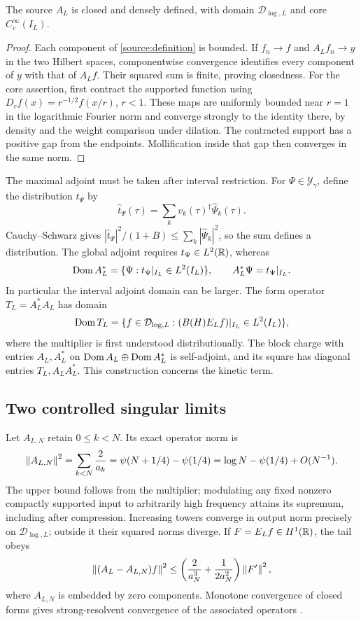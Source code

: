 \begin{proposition}\label{source:closed}
The source $A_L$ is closed and densely defined, with domain
$\mathcal D_{\log,L}$ and core $C_c^\infty(I_L)$.
\end{proposition}
\begin{proof}
Each component of \eqref{source:definition} is bounded. If
$f_n\to f$ and $A_Lf_n\to y$ in the two Hilbert spaces, componentwise
convergence identifies every component of $y$ with that of $A_Lf$.
Their squared sum is finite, proving closedness.
For the core assertion, first contract the supported function using
$D_rf(x)=r^{-1/2}f(x/r)$, $r<1$. These maps are uniformly bounded
near $r=1$ in the logarithmic Fourier norm and converge strongly
to the identity there, by density and the weight comparison under
dilation. The contracted support has a positive gap from the
endpoints. Mollification inside that gap then converges in the
same norm.
\end{proof}

The maximal adjoint must be taken after interval restriction.
For $\Psi\in\mathscr Y_\gamma$, define the distribution $t_\Psi$ by
\[
\widehat t_\Psi(\tau)=\sum_k v_k(\tau)^\dagger\widehat\Psi_k(\tau).
\]
Cauchy--Schwarz gives
$|\widehat t_\Psi|^2/(1+B)\le\sum_k|\widehat\Psi_k|^2$, so the sum
defines a distribution. The global adjoint requires $t_\Psi\in L^2(\mathbb R)$,
whereas
\begin{equation}\label{source:adjoint}
\operatorname{Dom} A_L^*=\{\Psi:t_\Psi|_{I_L}\in L^2(I_L)\},
\qquad A_L^*\Psi=t_\Psi|_{I_L}.
\end{equation}
In particular the interval adjoint domain can be larger. The form
operator $T_L=A_L^*A_L$ has domain
\begin{equation}\label{source:operator-domain}
\operatorname{Dom} T_L=
\{f\in\mathcal D_{\log,L}:
 (B(H)E_Lf)|_{I_L}\in L^2(I_L)\},
\end{equation}
where the multiplier is first understood distributionally.
The block charge with entries $A_L,A_L^*$ on
$\operatorname{Dom} A_L\oplus\operatorname{Dom} A_L^*$ is self-adjoint, and its square has
diagonal entries $T_L,A_LA_L^*$. This construction concerns the
kinetic term.

\subsection{Two controlled singular limits}
Let $A_{L,N}$ retain $0\le k<N$. Its exact operator norm is
\begin{equation}\label{source:tower-norm}
\left\lVert A_{L,N}\right\rVert^2
=\sum_{k<N}\frac2{a_k}
=\psi(N+1/4)-\psi(1/4)
=\log N-\psi(1/4)+O(N^{-1}).
\end{equation}
The upper bound follows from the multiplier; modulating any fixed
nonzero compactly supported input to arbitrarily high frequency
attains its supremum, including after compression. Increasing
towers converge in output norm precisely on
$\mathcal D_{\log,L}$; outside it their squared norms diverge.
If $F=E_Lf\in H^1(\mathbb R)$, the tail obeys
\[
\left\lVert(A_L-A_{L,N})f\right\rVert^2
\le\left(\frac2{a_N^3}+\frac1{2a_N^2}\right)\left\lVert F'\right\rVert^2,
\]
where $A_{L,N}$ is embedded by zero components.
Monotone convergence of closed forms gives strong-resolvent
convergence of the associated operators \cite{SimonForms}.

